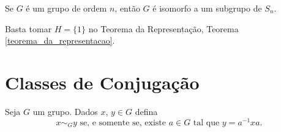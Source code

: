 \begin{corolario}\label{teorema_de_cayley}
	Se $G$ \'e um grupo de ordem $n$, ent\~ao $G$ \'e isomorfo a um subgrupo de $S_n$.
\end{corolario}
\begin{prova}
	Basta tomar $H = \{1\}$ no Teorema da Representa\c{c}\~ao, Teorema \ref{teorema_da_representacao}.
\end{prova}


\section{Classes de Conjugação} %
\label{sec:classes_de_conjugacao}

Seja $G$ um grupo. Dados $x$, $y \in G$ defina
\[
	x \sim_G y \mbox{ se, e somente se, existe } a \in G \mbox{ tal que } y = a^{-1}xa.
\]








